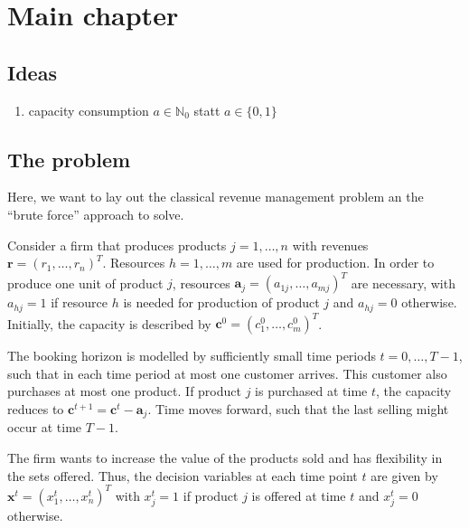 \chapter{Main chapter}

\section{Ideas}
\begin{enumerate}
	\item capacity consumption $a \in \mathbb{N}_0$ statt $a\in \{0,1\}$
\end{enumerate}

\section{The problem}

Here, we want to lay out the classical revenue management problem an the \enquote{brute force} approach to solve. 

Consider a firm that produces products $j = 1, \dots, n$ with revenues $\boldsymbol{r} = (r_1, \dots, r_n)^T$. Resources $h = 1, \dots, m$ are used for production. In order to produce one unit of product $j$, resources $\boldsymbol{a}_j = (a_{1j}, \dots, a_{mj})^T$ are necessary, with $a_{hj}=1$ if resource $h$ is needed for production of product $j$ and $a_{hj} = 0$ otherwise. Initially, the capacity is described by $\boldsymbol{c}^0 = (c_1^0, \dots, c_m^0)^T$. 

The booking horizon is modelled by sufficiently small time periods $t = 0, \dots, T-1$, such that in each time period at most one customer arrives. This customer also purchases at most one product. If product $j$ is purchased at time $t$, the capacity reduces to $\boldsymbol{c}^{t+1} = \boldsymbol{c}^t - \boldsymbol{a}_j$. Time moves forward, such that the last selling might occur at time $T-1$.

The firm wants to increase the value of the products sold and has flexibility in the sets offered. Thus, the decision variables at each time point $t$ are given by $\boldsymbol{x}^t = (x^t_1, \dots, x^t_n)^T$ with $x^t_j = 1$ if product $j$ is offered at time $t$ and $x^t_j = 0$ otherwise.

